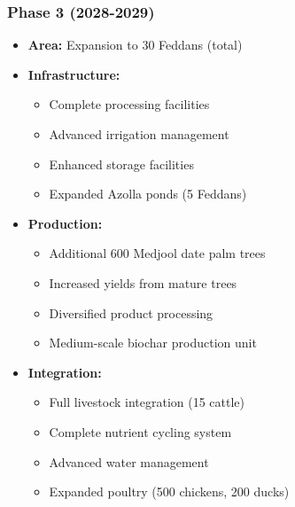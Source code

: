 \subsubsection{Phase 3 (2028-2029)}
\begin{itemize}
    \item \textbf{Area:} Expansion to 30 Feddans (total)
    \item \textbf{Infrastructure:}
    \begin{itemize}
        \item Complete processing facilities
        \item Advanced irrigation management
        \item Enhanced storage facilities
        \item Expanded Azolla ponds (5 Feddans)
    \end{itemize}
    \item \textbf{Production:}
    \begin{itemize}
        \item Additional 600 Medjool date palm trees
        \item Increased yields from mature trees
        \item Diversified product processing
        \item Medium-scale biochar production unit
    \end{itemize}
    \item \textbf{Integration:}
    \begin{itemize}
        \item Full livestock integration (15 cattle)
        \item Complete nutrient cycling system
        \item Advanced water management
        \item Expanded poultry (500 chickens, 200 ducks)
    \end{itemize}
\end{itemize}

